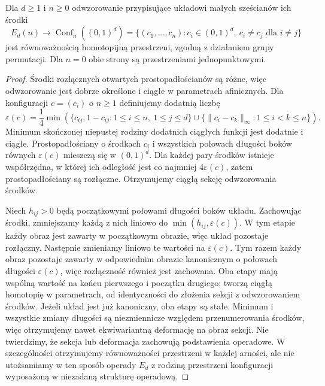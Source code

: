 \begin{stwierdzenie}\label{cat:prop:infty-little-cubes-config}
Dla $d\geq1$ i $n\geq0$ odwzorowanie przypisujące układowi małych sześcianów ich środki
\[
 E_d(n)\longrightarrow
 \operatorname{Conf}_n((0,1)^d)
 =\{(c_1,\ldots,c_n):c_i\in(0,1)^d,\ c_i\neq c_j\text{ dla }i\neq j\}
\]
jest równoważnością homotopijną przestrzeni, zgodną z działaniem grupy permutacji. Dla $n=0$ obie strony są przestrzeniami jednopunktowymi.
\end{stwierdzenie}
\begin{proof}
Środki rozłącznych otwartych prostopadłościanów są różne, więc odwzorowanie jest dobrze określone i ciągłe w parametrach afinicznych. Dla konfiguracji $c=(c_i)$ o $n\geq1$ definiujemy dodatnią liczbę
\[
 \varepsilon(c)=\frac14\min\left(
 \{c_{ij},1-c_{ij}:1\leq i\leq n,\ 1\leq j\leq d\}
 \cup\{\|c_i-c_k\|_\infty:1\leq i<k\leq n\}\right).
\]
Minimum skończonej niepustej rodziny dodatnich ciągłych funkcji jest dodatnie i ciągłe. Prostopadłościany o środkach $c_i$ i wszystkich połowach długości boków równych $\varepsilon(c)$ mieszczą się w $(0,1)^d$. Dla każdej pary środków istnieje współrzędna, w której ich odległość jest co najmniej $4\varepsilon(c)$, zatem prostopadłościany są rozłączne. Otrzymujemy ciągłą sekcję odwzorowania środków.

Niech $h_{ij}>0$ będą początkowymi połowami długości boków układu. Zachowując środki, zmniejszamy każdą z nich liniowo do $\min(h_{ij},\varepsilon(c))$. W tym etapie każdy obraz jest zawarty w początkowym obrazie, więc układ pozostaje rozłączny. Następnie zmieniamy liniowo te wartości na $\varepsilon(c)$. Tym razem każdy obraz pozostaje zawarty w odpowiednim obrazie kanonicznym o połowach długości $\varepsilon(c)$, więc rozłączność również jest zachowana. Oba etapy mają wspólną wartość na końcu pierwszego i początku drugiego; tworzą ciągłą homotopię w parametrach, od identyczności do złożenia sekcji z odwzorowaniem środków. Jeżeli układ jest już kanoniczny, oba etapy są stałe. Minimum i wszystkie zmiany długości są niezmiennicze względem przenumerowania środków, więc otrzymujemy nawet ekwiwariantną deformację na obraz sekcji. Nie twierdzimy, że sekcja lub deformacja zachowują podstawienia operadowe. W szczególności otrzymujemy równoważności przestrzeni w każdej arności, ale nie utożsamiamy w ten sposób operady $E_d$ z rodziną przestrzeni konfiguracji wyposażoną w niezadaną strukturę operadową.
\end{proof}

